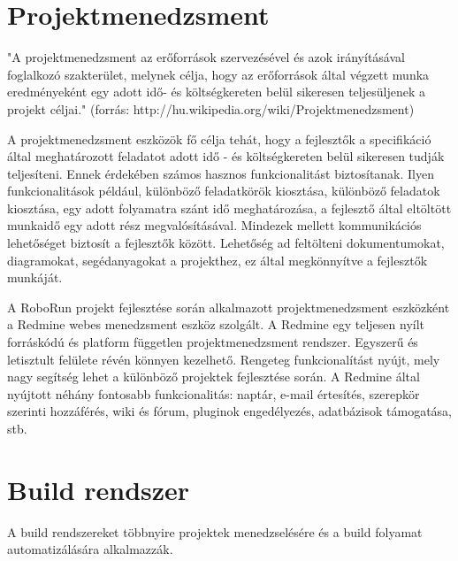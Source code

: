 \section{Projektmenedzsment}

"A projektmenedzsment az erőforrások szervezésével és azok irányításával foglalkozó szakterület, melynek célja, hogy az erőforrások által végzett munka eredményeként egy adott idő- és költségkereten belül sikeresen teljesüljenek a projekt céljai." (forrás: http://hu.wikipedia.org/wiki/Projektmenedzsment)

	A projektmenedzsment eszközök fő célja tehát, hogy a fejlesztők a specifikáció által meghatározott feladatot adott idő - és költségkereten belül sikeresen tudják teljesíteni. Ennek érdekében számos hasznos funkcionalitást biztosítanak. Ilyen funkcionalitások például, különböző feladatkörök kiosztása, különböző feladatok kiosztása, egy adott folyamatra szánt idő meghatározása, a fejlesztő által eltöltött munkaidő egy adott rész megvalósításával. Mindezek mellett kommunikációs lehetőséget biztosít a fejlesztők között. Lehetőség ad feltölteni dokumentumokat, diagramokat, segédanyagokat a projekthez, ez által megkönnyítve a fejlesztők munkáját. 
	
	A RoboRun projekt fejlesztése során alkalmazott projektmenedzsment eszközként a Redmine\citep{redmine} webes menedzsment eszköz szolgált. A Redmine egy teljesen  nyílt forráskódú és platform független projektmenedzsment rendszer. Egyszerű és letisztult felülete révén könnyen kezelhető. Rengeteg funkcionalítást nyújt, mely nagy segítség lehet a különböző projektek fejlesztése során. A  Redmine által nyújtott néhány fontosabb funkcionalitás: naptár, e-mail értesítés, szerepkör szerinti hozzáférés, wiki és fórum, pluginok engedélyezés, adatbázisok támogatása, stb.



\section{Build rendszer}

A build rendszereket többnyire projektek menedzselésére és a build folyamat automatizálására alkalmazzák. 


